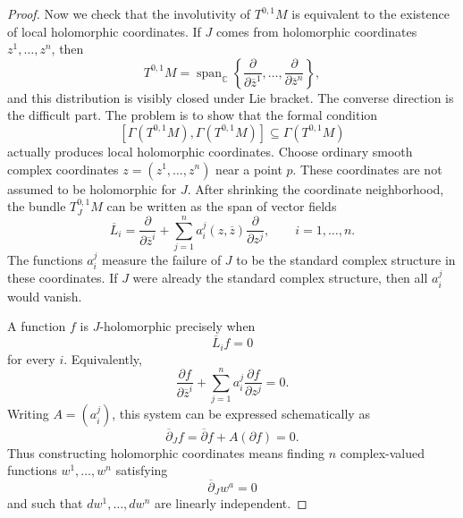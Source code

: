 \documentclass[12pt]{article}
\begin{document}
\begin{proof}
    Now we check that the involutivity of $T^{0,1}M$ is equivalent to the existence of local holomorphic coordinates. If $J$ comes from holomorphic coordinates
    $z^1,\ldots,z^n$, then
    \[
        T^{0,1}M
        =
        \operatorname{span}_{\mathbb C}
        \left\{
        \frac{\partial}{\partial \overline z^1},
        \ldots,
        \frac{\partial}{\partial \overline z^n}
        \right\},
    \]
    and this distribution is visibly closed under Lie bracket. The converse direction is the difficult part. The problem is to show that the formal condition
    \[
        [\Gamma(T^{0,1}M),\Gamma(T^{0,1}M)]
        \subseteq
        \Gamma(T^{0,1}M)
    \]
    actually produces local holomorphic coordinates. Choose ordinary smooth complex coordinates $z=(z^1,\ldots,z^n)$ near a point $p$. These coordinates are not assumed to be holomorphic for $J$.
    After shrinking the coordinate neighborhood, the bundle $T^{0,1}_J M$ can be
    written as the span of vector fields
    \[
        \overline L_i
        =
        \frac{\partial}{\partial \overline z^i}
        +
        \sum_{j=1}^n a_i^j(z,\overline z)
        \frac{\partial}{\partial z^j},
        \qquad i=1,\ldots,n.
    \]
    The functions $a_i^j$ measure the failure of $J$ to be the standard complex
    structure in these coordinates. If $J$ were already the standard complex
    structure, then all $a_i^j$ would vanish.

    A function $f$ is $J$-holomorphic precisely when
    \[
        \overline L_i f=0
    \]
    for every $i$. Equivalently,
    \[
        \frac{\partial f}{\partial \overline z^i}
        +
        \sum_{j=1}^n a_i^j
        \frac{\partial f}{\partial z^j}
        =
        0.
    \]
    Writing $A=(a_i^j)$, this system can be expressed schematically as
    \[
        \overline\partial_J f = \overline\partial f + A(\partial f)=0.
    \]
    Thus constructing holomorphic coordinates means finding $n$ complex-valued
    functions $w^1,\ldots,w^n$ satisfying
    \[
        \overline\partial_J w^a=0
    \]
    and such that $dw^1,\ldots,dw^n$ are linearly independent.


\end{proof}
\end{document}
